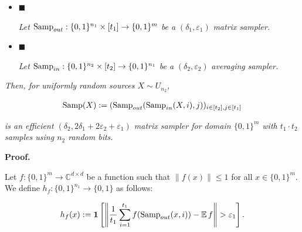 \begin{itemize}


\item[] 
$\blacksquare$ 


\emph{Let }$\textup{{Samp}}_{out}:\{0,1\}^{n_{1}}\times[t_{1}]\to\{0,1\}^{m}$\emph{ be a }$(\delta_{1},\varepsilon_{1})$\emph{ matrix sampler.}\par





\item[] 
$\blacksquare$ 


\emph{Let }$\textup{{Samp}}_{in}:\{0,1\}^{n_{2}}\times[t_{2}]\to\{0,1\}^{n_{1}}$\emph{ be a }$(\delta_{2},\varepsilon_{2})$\emph{ }\emph{averaging}\emph{ sampler.}\par





\end{itemize}


\emph{Then, for uniformly random sources $X\sim U_{n_{2}}$,}\par


\[\begin{gathered}
\textup{{Samp}}(X):=(\textup{{Samp}}_{out}(\textup{{Samp}}_{in}(X,i),j))_{i\in[t_{2}],j\in[t_{1}]}
\end{gathered}\]


\emph{is an efficient $(\delta_{2},2\delta_{1}+2\varepsilon_{2}+\varepsilon_{1})$ matrix sampler for domain $\{0,1\}^{m}$ with $t_{1}\cdot t_{2}$ samples using $n_{2}$ random bits.}\par







\par\medskip\noindent\textbf{Proof.}\par




Let $f:\{0,1\}^{m}\to\mathbb{C}^{d\times d}$ be a function such that $\|f(x)\|\leq 1$ for all $x\in\{0,1\}^{m}$.
We define $h_{f}:\{0,1\}^{n_{1}}\to\{0,1\}$ as follows:\par


\[\begin{gathered}
h_{f}(x):=\mathbf{1}\left[\left\lVert\frac{1}{t_{1}}\sum_{i=1}^{t_{1}}f(\textup{{Samp}}_{out}(x,i))-\operatorname*{\mathbb{E}}f\right\rVert>\varepsilon_{1}\right].
\end{gathered}\]


